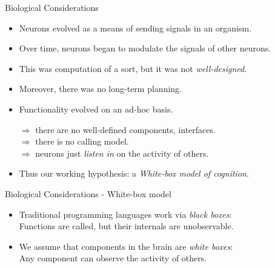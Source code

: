 \documentclass{beamer}
\begin{document}
   

   \begin{frame}{Biological Considerations}
      \begin{itemize}
         \item Neurons evolved as a means of sending signals in an organism.
         \item Over time, neurons began to modulate the signals of other neurons.
         \item This was computation of a sort, but it was not \emph{well-designed}.
         \item Moreover, there was no long-term planning.
         \item Functionality evolved on an ad-hoc basis.\\
         
         \vspace{2mm}
         
            $\Rightarrow$ there are no well-defined components, interfaces.\\
            $\Rightarrow$ there is no calling model.\\
            $\Rightarrow$ neurons just \emph{listen in} on the activity of others.
            
         \pause
         \item Thus our working hypothesis: a \emph{White-box model of cognition}.
       \end{itemize}
   \end{frame}
   
   \begin{frame}{Biological Considerations - White-box model}
      \begin{itemize}
         \item Traditional programming languages work via \emph{black boxes}:\\
              \vspace{2mm}
               Functions are called, but their internals are unobservable.
               \vspace{2mm}
         \item We assume that components in the brain are \emph{white boxes}:\\
              \vspace{2mm}
               Any component can observe the activity of others.
      \end{itemize}
   \end{frame}
   
\end{document}
